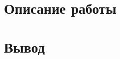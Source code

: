 \documentclass[14pt, a4paper]{extarticle}
\begin{document}
	\newpage
	
	\section*{Описание работы}
	
	
	
	\newpage
	
	\section*{Вывод}
	

	
\end{document}
